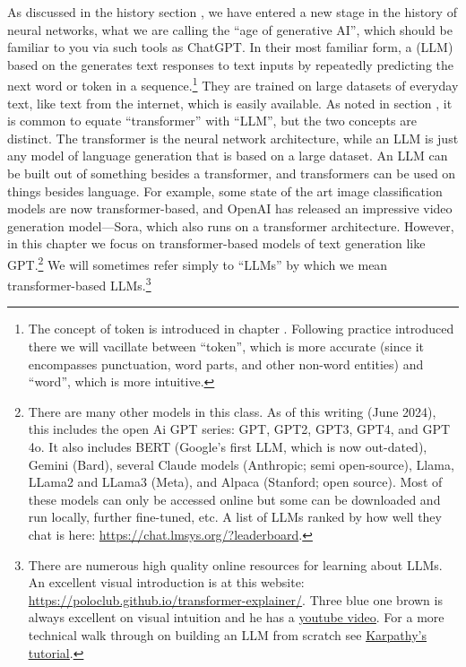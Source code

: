 As discussed in the history section , we have entered a new stage in the history of neural networks, what we are calling the ``age of generative AI'', which should be familiar to you via such tools as ChatGPT. In their most familiar form, a  (LLM) based on the  generates text responses to text inputs by repeatedly predicting the next word or token in a sequence.\footnote{The concept of token is introduced in chapter . Following practice introduced there we will vacillate between ``token'', which is more accurate (since it encompasses punctuation, word parts, and other non-word entities) and ``word'', which is more intuitive.} They are trained on large datasets of everyday text, like text from the internet, which is easily available. As noted in section , it is common to equate ``transformer'' with ``LLM'', but the two concepts are distinct. The transformer is the neural network architecture, while an LLM is just any model of language generation that is based on a large dataset. An LLM can be built out of something besides a transformer, and transformers can be used on things besides language. For example, some state of the art image classification models are now transformer-based, and OpenAI has released an impressive video generation model---Sora, which also runs on a transformer architecture. However, in this chapter we focus on transformer-based models of text generation like GPT.\footnote{There are many other models in this class. As of this writing (June 2024), this includes the open Ai GPT series: GPT, GPT2, GPT3, GPT4, and GPT 4o. It also includes BERT (Google’s first LLM, which is now out-dated), Gemini (Bard), several Claude models (Anthropic;  semi open-source), Llama, LLama2 and LLama3 (Meta), and Alpaca (Stanford; open source). Most of these models can only be accessed online but some can be downloaded and run locally, further fine-tuned, etc. A list of LLMs ranked by how well they chat is here: \url{https://chat.lmsys.org/?leaderboard}.} We will sometimes refer simply to ``LLMs'' by which we mean transformer-based LLMs.\footnote{There are numerous high quality online resources for learning about LLMs. An excellent visual introduction is at this website: \url{https://poloclub.github.io/transformer-explainer/}. Three blue one brown is always excellent on visual intuition and he has a \href{https://www.youtube.com/watch?v=wjZofJX0v4M&list=PLZHQObOWTQDNU6R1_67000Dx_ZCJB-3pi}{\underline{youtube video}}. For a more technical walk through on building an LLM from scratch see \href{https://www.youtube.com/watch?v=kCc8FmEb1nY}{\underline{Karpathy's tutorial}}.}

